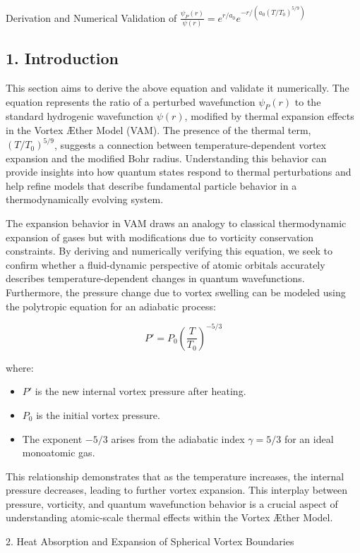 
Derivation and Numerical Validation of \(\frac{\psi_P(r)}{\psi(r)} = e^{r/a_0} e^{-r / (a_0 (T/T_0)^{5/9})}\)

\subsection*{1. Introduction}

This section aims to derive the above equation and validate it numerically. The equation represents the ratio of a perturbed wavefunction \(\psi_P(r)\) to the standard hydrogenic wavefunction \(\psi(r)\), modified by thermal expansion effects in the Vortex Æther Model (VAM). The presence of the thermal term, \((T/T_0)^{5/9}\), suggests a connection between temperature-dependent vortex expansion and the modified Bohr radius. Understanding this behavior can provide insights into how quantum states respond to thermal perturbations and help refine models that describe fundamental particle behavior in a thermodynamically evolving system.

The expansion behavior in VAM draws an analogy to classical thermodynamic expansion of gases but with modifications due to vorticity conservation constraints. By deriving and numerically verifying this equation, we seek to confirm whether a fluid-dynamic perspective of atomic orbitals accurately describes temperature-dependent changes in quantum wavefunctions. Furthermore, the pressure change due to vortex swelling can be modeled using the polytropic equation for an adiabatic process:

\[P' = P_0 \left( \frac{T}{T_0} \right)^{-5/3}\]

where:

\begin{itemize}
\item \(P'\) is the new internal vortex pressure after heating.
\item \(P_0\) is the initial vortex pressure.
\item The exponent \(-5/3\) arises from the adiabatic index \(\gamma = 5/3\) for an ideal monoatomic gas.
\end{itemize}

This relationship demonstrates that as the temperature increases, the internal pressure decreases, leading to further vortex expansion. This interplay between pressure, vorticity, and quantum wavefunction behavior is a crucial aspect of understanding atomic-scale thermal effects within the Vortex Æther Model.


2. Heat Absorption and Expansion of Spherical Vortex Boundaries

